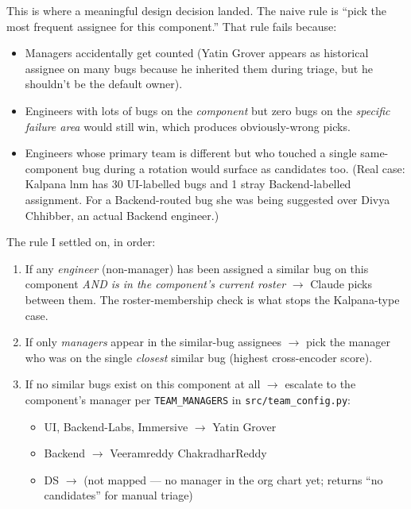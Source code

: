 \documentclass[11pt,a4paper]{article}
\begin{document}
This is where a meaningful design decision landed. The naive rule is ``pick
the most frequent assignee for this component.'' That rule fails because:

\begin{itemize}[leftmargin=1.4em,nosep]
\item Managers accidentally get counted (Yatin Grover appears as historical
      assignee on many bugs because he inherited them during triage, but he
      shouldn't be the default owner).
\item Engineers with lots of bugs on the \emph{component} but zero bugs on
      the \emph{specific failure area} would still win, which produces
      obviously-wrong picks.
\item Engineers whose primary team is different but who touched a single
      same-component bug during a rotation would surface as candidates too.
      (Real case: Kalpana lnm has 30 UI-labelled bugs and 1 stray
      Backend-labelled assignment. For a Backend-routed bug she was being
      suggested over Divya Chhibber, an actual Backend engineer.)
\end{itemize}

The rule I settled on, in order:

\begin{enumerate}[leftmargin=1.4em,nosep]
\item If any \emph{engineer} (non-manager) has been assigned a similar bug
      on this component \emph{AND is in the component's current roster}
      $\rightarrow$ Claude picks between them. The roster-membership check
      is what stops the Kalpana-type case.
\item If only \emph{managers} appear in the similar-bug assignees $\rightarrow$
      pick the manager who was on the single \emph{closest} similar bug
      (highest cross-encoder score).
\item If no similar bugs exist on this component at all $\rightarrow$ escalate
      to the component's manager per \texttt{TEAM\_MANAGERS} in
      \texttt{src/team\_config.py}:
      \begin{itemize}[nosep]
      \item UI, Backend-Labs, Immersive $\rightarrow$ Yatin Grover
      \item Backend $\rightarrow$ Veeramreddy ChakradharReddy
      \item DS $\rightarrow$ (not mapped --- no manager in the org chart yet;
            returns ``no candidates'' for manual triage)
      \end{itemize}
\end{enumerate}
\end{document}
